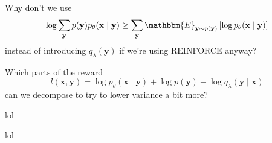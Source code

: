 \documentclass{beamer}
\let\tempone\itemize
\let\temptwo\enditemize
\renewenvironment{itemize}{\tempone\addtolength{\itemsep}{0.5\baselineskip}}{\temptwo}
\newcommand{\E}[2]{\mathbbm{E}_{#1}\left[#2\right]}
\newcommand{\bx}{\mathbf{x}}
\newcommand{\by}{\mathbf{y}}
\begin{document}
\begin{frame}
\begin{center}
\end{center}
\begin{itemize}
\item Why don't we use
$$\log\sum_\by p(\by)p_\theta(\bx\mid\by) \geq \sum_\by \E{\by\sim p(\by)}{\log p_\theta(\bx\mid\by)}$$
instead of introducing $q_\lambda(\by)$ if we're using REINFORCE anyway?
\item Which parts of the reward
$$l(\bx, \by) = \log p_\theta(\bx\mid\by) + \log p(\by) - \log q_\lambda(\by\mid\bx)$$
can we decompose to try to lower variance a bit more?
\end{itemize}
\end{frame}


\begin{frame}
\begin{center}
\end{center}
\begin{itemize}
\item lol
\end{itemize}
\end{frame}


\begin{frame}
\begin{center}
\end{center}
\begin{itemize}
\item lol
\end{itemize}
\end{frame}


\end{document}
